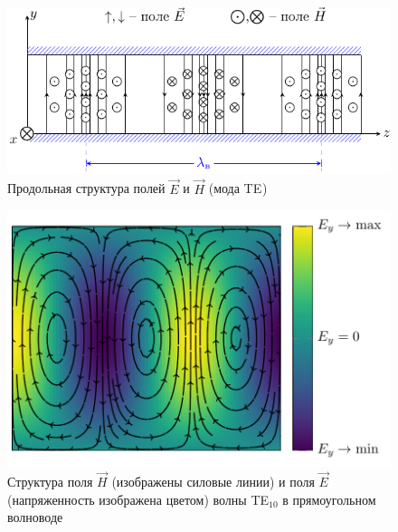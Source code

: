 \begin{figure}[H]
	\centering
	\includegraphics[width=\textwidth]{img/lect4_ris10}
	\caption{Продольная структура полей $\vec{E}$ и $\vec{H}$ (мода TE$_{}$)}
	\label{fig:lect4:10}
\end{figure}

\begin{figure}[H]
	\centering
	\includegraphics[scale=1]{img/lect4_ris11}
	\caption{Структура поля $\vec{H}$ (изображены силовые линии) и поля $\vec{E}$ (напряженность изображена цветом) волны TE$_{10}$ в прямоугольном волноводе}
	\label{fig:lect4:11}
\end{figure}
